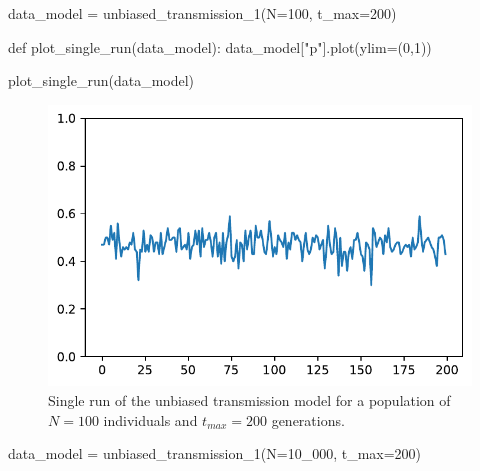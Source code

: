 \documentclass[
  a4paperpaper,
  ,captions=tableheading
]{scrbook}
\newenvironment{Shaded}{\begin{snugshade}}{\end{snugshade}}
\newcommand{\DecValTok}[1]{\textcolor[rgb]{0.68,0.00,0.00}{#1}}
\newcommand{\KeywordTok}[1]{\textcolor[rgb]{0.00,0.23,0.31}{#1}}
\newcommand{\NormalTok}[1]{\textcolor[rgb]{0.00,0.23,0.31}{#1}}
\newcommand{\OperatorTok}[1]{\textcolor[rgb]{0.37,0.37,0.37}{#1}}
\newcommand{\StringTok}[1]{\textcolor[rgb]{0.13,0.47,0.30}{#1}}
\begin{document}
\begin{Shaded}
\begin{Highlighting}[]
\NormalTok{data\_model }\OperatorTok{=}\NormalTok{ unbiased\_transmission\_1(N}\OperatorTok{=}\DecValTok{100}\NormalTok{, t\_max}\OperatorTok{=}\DecValTok{200}\NormalTok{)}
\end{Highlighting}
\end{Shaded}

\begin{Shaded}
\begin{Highlighting}[]
\KeywordTok{def}\NormalTok{ plot\_single\_run(data\_model):}
\NormalTok{    data\_model[}\StringTok{"p"}\NormalTok{].plot(ylim}\OperatorTok{=}\NormalTok{(}\DecValTok{0}\NormalTok{,}\DecValTok{1}\NormalTok{))}
\end{Highlighting}
\end{Shaded}

\begin{Shaded}
\begin{Highlighting}[]
\NormalTok{plot\_single\_run(data\_model)}
\end{Highlighting}
\end{Shaded}

\begin{figure}[H]

{\centering \includegraphics{chapter03_files/figure-pdf/cell-18-output-1.pdf}

}

\caption{Single run of the unbiased transmission model for a population
of \(N=100\) individuals and \(t_{max}=200\) generations.}

\end{figure}

\begin{Shaded}
\begin{Highlighting}[]
\NormalTok{data\_model }\OperatorTok{=}\NormalTok{ unbiased\_transmission\_1(N}\OperatorTok{=}\DecValTok{10\_000}\NormalTok{, t\_max}\OperatorTok{=}\DecValTok{200}\NormalTok{)}
\end{Highlighting}
\end{Shaded}
\end{document}
